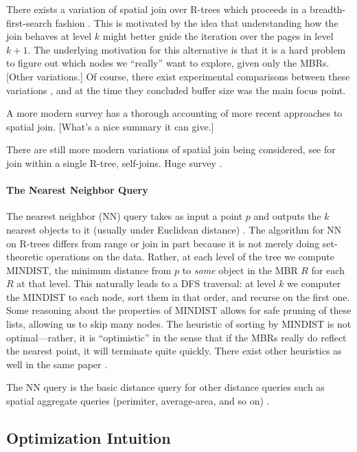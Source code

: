 There exists a variation of spatial join over R-trees which proceeds in a breadth-first-search fashion \cite{huangjingrundensteiner97}.
This is motivated by the idea that understanding how the join behaves at level $k$ might better guide the iteration over the pages in level $k+1$.
The underlying motivation for this alternative is that it is a hard problem to figure out which nodes we ``really'' want to explore, given only the MBRs.
[Other variations.]
Of course, there exist experimental comparisons between these variations \cite{papadopoulosrigauxscholl99}, and at the time they concluded buffer size was the main focus point.

A more modern survey \cite{jacoxsamet07} has a thorough accounting of more recent approaches to spatial join.
[What's a nice summary it can give.]

There are still more modern variations of spatial join being considered, see \cite{vassilakopouloscorralkaranikolas11} for join within a single R-tree, self-joins.
Huge survey \cite{jacoxsamet07}.

\paragraph{The Nearest Neighbor Query}
The nearest neighbor (NN) query takes as input a point $p$ and outputs the $k$ nearest objects to it (usually under Euclidean distance) \cite{roussopouloskelleyvincent95}.
The algorithm for NN on R-trees differs from range or join in part because it is not merely doing set-theoretic operations on the data. 
Rather, at each level of the tree we compute MINDIST, the minimum distance from $p$ to \emph{some} object in the MBR $R$ for each $R$ at that level.
This naturally leads to a DFS traversal: at level $k$ we computer the MINDIST to each node, sort them in that order, and recurse on the first one.
Some reasoning about the properties of MINDIST allows for safe pruning of these lists, allowing us to skip many nodes.
The heuristic of sorting by MINDIST is not optimal---rather, it is ``optimistic'' in the sense that if the MBRs really do reflect the nearest point, it will terminate quite quickly.
There exist other heuristics as well in the same paper \cite{roussopouloskelleyvincent95}.

The NN query is the basic distance query for other distance queries such as spatial aggregate queries (perimiter, average-area, and so on) \cite{corralalmendros-jimenez07}.


\subsection{Optimization Intuition}

